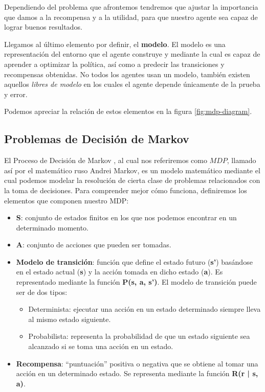 Dependiendo del problema que afrontemos tendremos que ajustar la importancia que damos a la recompensa y a la utilidad, para que nuestro agente sea capaz de lograr buenos resultados.

Llegamos al último elemento por definir, el \textbf{modelo}. El modelo es una representación del entorno que el agente construye y mediante la cual es capaz de aprender a optimizar la política, así como a predecir las transiciones y recompensas obtenidas. No todos los agentes usan un modelo, también existen aquellos \textit{libres de modelo} en los cuales el agente depende únicamente de la prueba y error. 


Podemos apreciar la relación de estos elementos en la figura \ref{fig:mdp-diagram}.


\subsection{Problemas de Decisión de Markov}
\label{sec:mdp}

El Proceso de Decisión de Markov \citet{Puterman1994}, al cual nos referiremos como $MDP$, llamado así por el matemático ruso Andrei Markov, es un modelo matemático mediante el cual podemos modelar la resolución de cierta clase de problemas relacionados con la toma de decisiones. Para comprender mejor cómo funciona, definiremos los elementos que componen nuestro MDP:

\begin{itemize}
    \item \textbf{S}: conjunto de estados finitos en los que nos podemos encontrar en un determinado momento.
    \item \textbf{A}: conjunto de acciones que pueden ser tomadas.
    \item \textbf{Modelo de transición}: función que define el estado futuro (\textbf{s'}) basándose en el estado actual (\textbf{s}) y la acción tomada en dicho estado (\textbf{a}). Es representado mediante la función \textbf{P(s, a, s’)}. El modelo de transición puede ser de dos tipos:
    \begin{itemize}
        \item Determinista: ejecutar una acción en un estado determinado siempre lleva al mismo estado siguiente.
        \item Probabilista: representa la probabilidad de que un estado siguiente sea alcanzado si se toma una acción en un estado.
    \end{itemize}
    \item \textbf{Recompensa}: “puntuación” positiva o negativa que se obtiene al tomar una acción en un determinado estado. Se representa mediante la función \textbf{R(r | s, a)}.
\end{itemize}


